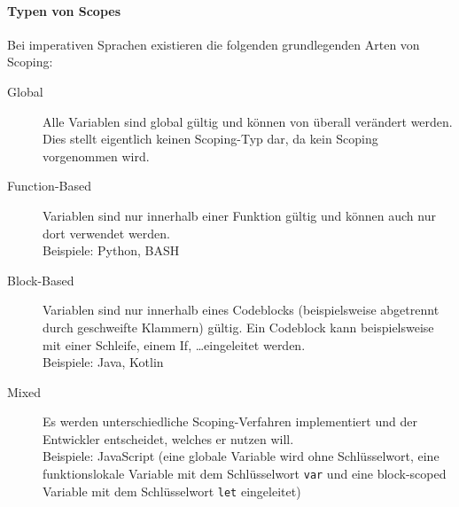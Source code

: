 \paragraph{Typen von Scopes}
	Bei imperativen Sprachen existieren die folgenden grundlegenden Arten von Scoping:
	\begin{description}
		\item[Global] Alle Variablen sind global gültig und können von überall verändert werden. \\ Dies stellt eigentlich keinen Scoping-Typ dar, da kein Scoping vorgenommen wird.
		\item[Function-Based] Variablen sind nur innerhalb einer Funktion gültig und können auch nur dort verwendet werden. \\ Beispiele: Python, BASH
		\item[Block-Based] Variablen sind nur innerhalb eines Codeblocks (beispielsweise abgetrennt durch geschweifte Klammern) gültig. Ein Codeblock kann beispielsweise mit einer Schleife, einem If, \dots eingeleitet werden. \\ Beispiele: Java, Kotlin
		\item[Mixed] Es werden unterschiedliche Scoping-Verfahren implementiert und der Entwickler entscheidet, welches er nutzen will. \\ Beispiele: JavaScript (eine globale Variable wird ohne Schlüsselwort, eine funktionslokale Variable mit dem Schlüsselwort \texttt{var} und eine block-scoped Variable mit dem Schlüsselwort \texttt{let} eingeleitet)
	\end{description}
